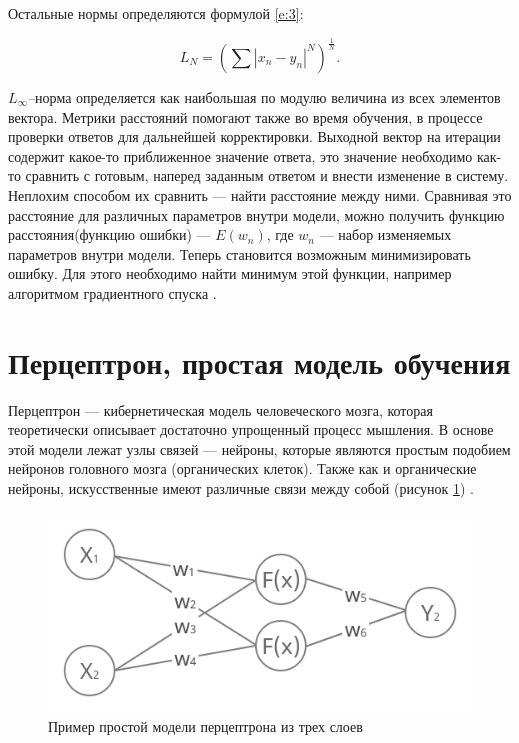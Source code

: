 	
Остальные нормы определяются формулой \ref{e:3}: 

\begin{equation}\label{e:3}
L_{N} = (\sum |x_{n}-y_{n}|^N)^\frac{1}{N}.
\end{equation}

	
$L_{\infty}$--норма определяется как наибольшая по модулю величина из всех элементов вектора.
Метрики расстояний помогают также во время обучения, в процессе проверки ответов для дальнейшей корректировки. Выходной вектор на итерации содержит какое-то приближенное значение ответа, это значение необходимо как-то сравнить с готовым, наперед заданным ответом и внести изменение в систему. Неплохим способом их сравнить — найти расстояние между ними. Сравнивая это расстояние для различных параметров внутри модели, можно получить функцию расстояния(функцию ошибки) — $E(w_{n})$, где $w_{n}$ — набор изменяемых параметров внутри модели. Теперь становится возможным минимизировать ошибку. Для этого необходимо найти минимум этой функции, например алгоритмом градиентного спуска \cite{5, 7}.


\section{Перцептрон, простая модель обучения}


Перцептрон — кибернетическая модель человеческого мозга, которая теоретически описывает достаточно упрощенный процесс мышления. В основе этой модели лежат узлы связей — нейроны, которые являются простым подобием нейронов головного мозга (органических клеток). Также как и органические нейроны, искусственные имеют различные связи между собой (рисунок \ref{fig:1}) \cite{3,9}. 

\begin{figure}[ht] 
  \center
  \includegraphics [scale=0.4] {img/Perceptron.png}
  \caption{Пример простой модели перцептрона из трех слоев} 
  \label{fig:1}  
\end{figure}

